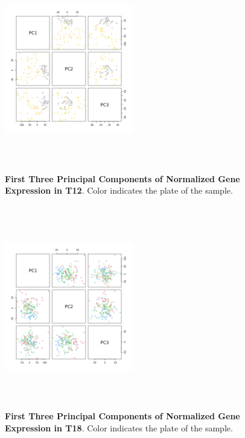 \documentclass[article,9pt,twocolumn,twoside]{rilabRxiv}
\begin{document}
\begin{figure}[!ht]
\centering
\includegraphics[width=0.5\textwidth,height=3.5in]{figures/exp_WD_0712_PC_pairs.png}
\caption{\textbf{First Three Principal Components of Normalized Gene Expression in T12}. Color indicates the plate of the sample.}
\label{fig:chapter2_t12pc}
\end{figure}

\begin{figure}[!ht]
\centering
\includegraphics[width=0.5\textwidth,height=3.5in]{figures/exp_WD_0718_PC_pairs.png}
\caption{\textbf{First Three Principal Components of Normalized Gene Expression in T18}. Color indicates the plate of the sample.}
\label{fig:chapter2_t18pc}
\end{figure}
\end{document}
